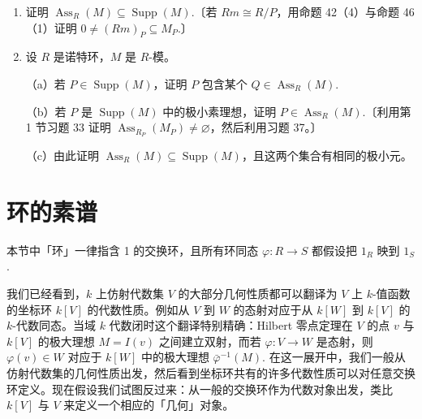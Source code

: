 \begin{enumerate}
（b）证明 \(\operatorname{Ass}_{D^{-1}R}(D^{-1}N') = \varnothing\)，并由此 \(D^{-1}N' = 0\) 且 \(\pi'\) 是单射。〔利用上一习题、\(S\) 的定义与第 1 节习题 34。〕

（c）若 \(K\) 是 \(\varphi'\) 的核，证明 \(\operatorname{Ann}(x) \cap D \neq \varnothing\)（\(x \in K\)）且 \(\operatorname{Ass}_R(K) \subseteq S\). 证明 \(\operatorname{Ass}_R(K) \subseteq \operatorname{Ass}_R(M/N')\) 蕴涵 \(\operatorname{Ass}_R(K) = \varnothing\)，并由此 \(K = 0\).

（d）证明 \(\varphi\) 与 \(\pi\) 的核相同，即 \(N = N'\)，且 \(M\) 的这个子模唯一。

\noindent 下面两个习题建立与 \(R\)-模 \(M\) 相关的素理想集合 \(\operatorname{Ass}_R(M)\) 与 \(\operatorname{Supp}(M)\) 之间的基本关系。

\item 证明 \(\operatorname{Ass}_R(M) \subseteq \operatorname{Supp}(M)\).〔若 \(Rm \cong R/P\)，用命题 42（4）与命题 46（1）证明 \(0 \neq (Rm)_P \subseteq M_P\).〕

\item 设 \(R\) 是诺特环，\(M\) 是 \(R\)-模。

（a）若 \(P \in \operatorname{Supp}(M)\)，证明 \(P\) 包含某个 \(Q \in \operatorname{Ass}_R(M)\).

（b）若 \(P\) 是 \(\operatorname{Supp}(M)\) 中的极小素理想，证明 \(P \in \operatorname{Ass}_R(M)\).〔利用第 1 节习题 33 证明 \(\operatorname{Ass}_{R_P}(M_P) \neq \varnothing\)，然后利用习题 37。〕

（c）由此证明 \(\operatorname{Ass}_R(M) \subseteq \operatorname{Supp}(M)\)，且这两个集合有相同的极小元。
\end{enumerate}

\section{环的素谱}

本节中「环」一律指含 1 的交换环，且所有环同态 \(\varphi : R \to S\) 都假设把 \(1_R\) 映到 \(1_S\).

我们已经看到，\(k\) 上仿射代数集 \(V\) 的大部分几何性质都可以翻译为 \(V\) 上 \(k\)-值函数的坐标环 \(k[V]\) 的代数性质。例如从 \(V\) 到 \(W\) 的态射对应于从 \(k[W]\) 到 \(k[V]\) 的 \(k\)-代数同态。当域 \(k\) 代数闭时这个翻译特别精确：Hilbert 零点定理在 \(V\) 的点 \(v\) 与 \(k[V]\) 的极大理想 \(M = I(v)\) 之间建立双射，而若 \(\varphi : V \to W\) 是态射，则 \(\varphi(v) \in W\) 对应于 \(k[W]\) 中的极大理想 \(\bar\varphi^{-1}(M)\). 在这一展开中，我们一般从仿射代数集的几何性质出发，然后看到坐标环共有的许多代数性质可以对任意交换环定义。现在假设我们试图反过来：从一般的交换环作为代数对象出发，类比 \(k[V]\) 与 \(V\) 来定义一个相应的「几何」对象。

